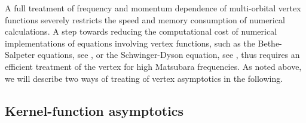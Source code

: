 \documentclass[../../main.tex]{subfiles}
\begin{document}
A full treatment of frequency and momentum dependence of multi-orbital vertex functions severely restricts the speed and memory consumption of numerical calculations. A step towards reducing the computational cost of numerical implementations of equations involving vertex functions, such as the Bethe-Salpeter equations, see , or the Schwinger-Dyson equation, see , thus requires an efficient treatment of the vertex for high Matsubara frequencies. As noted above, we will describe two ways of treating of vertex asymptotics in the following.

\subsection{Kernel-function asymptotics}\label{sec:vertex_asymptotics_kernel}
\end{document}
